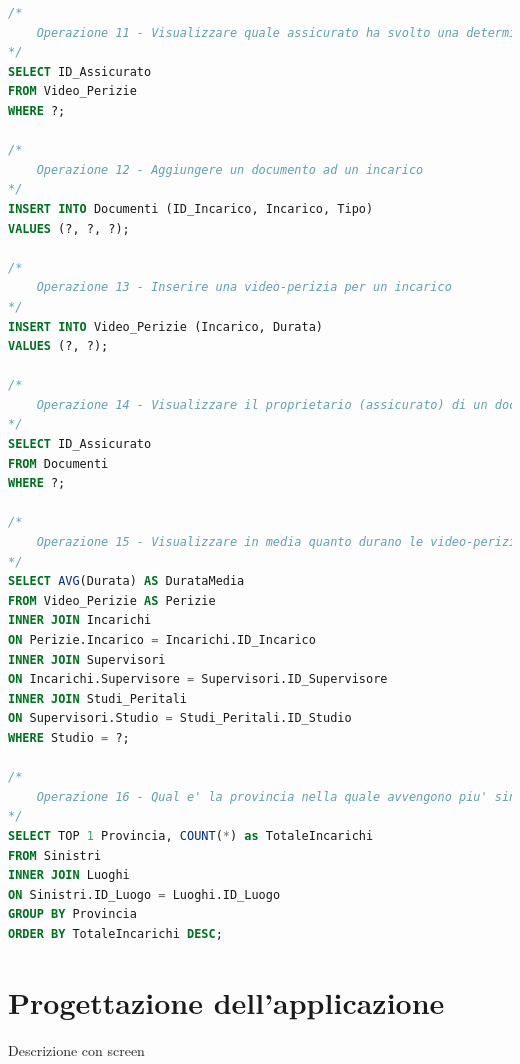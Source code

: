 \documentclass[a4paper,12pt]{report}
\begin{document}
\begin{lstlisting}[language=SQL]
/*
    Operazione 11 - Visualizzare quale assicurato ha svolto una determinata video-perizia 
*/
SELECT ID_Assicurato
FROM Video_Perizie
WHERE ?;

/*
    Operazione 12 - Aggiungere un documento ad un incarico 
*/
INSERT INTO Documenti (ID_Incarico, Incarico, Tipo)
VALUES (?, ?, ?);

/*
    Operazione 13 - Inserire una video-perizia per un incarico 
*/
INSERT INTO Video_Perizie (Incarico, Durata)
VALUES (?, ?);

/*
    Operazione 14 - Visualizzare il proprietario (assicurato) di un documento
*/
SELECT ID_Assicurato
FROM Documenti
WHERE ?;

/*
    Operazione 15 - Visualizzare in media quanto durano le video-perizie di un determinato studio peritale 
*/
SELECT AVG(Durata) AS DurataMedia
FROM Video_Perizie AS Perizie
INNER JOIN Incarichi 
ON Perizie.Incarico = Incarichi.ID_Incarico
INNER JOIN Supervisori
ON Incarichi.Supervisore = Supervisori.ID_Supervisore
INNER JOIN Studi_Peritali 
ON Supervisori.Studio = Studi_Peritali.ID_Studio
WHERE Studio = ?;

/*
    Operazione 16 - Qual e' la provincia nella quale avvengono piu' sinistri
*/
SELECT TOP 1 Provincia, COUNT(*) as TotaleIncarichi
FROM Sinistri 
INNER JOIN Luoghi
ON Sinistri.ID_Luogo = Luoghi.ID_Luogo
GROUP BY Provincia
ORDER BY TotaleIncarichi DESC;
\end{lstlisting}





\chapter{Progettazione dell'applicazione}


Descrizione con screen
\end{document}
